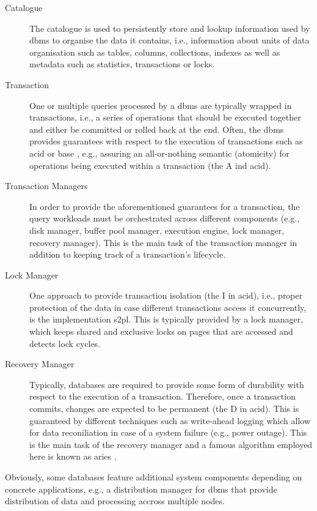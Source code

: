 \begin{description}
    \item[Catalogue] The catalogue is used to persistently store and lookup information used by \acrshort{dbms} to organise the data it contains, i.e., information about units of data organisation such as tables, columns, collections, indexes as well as metadata such as statistics, transactions or locks.
    \item[Transaction] One or multiple queries processed by a \acrshort{dbms} are typically wrapped in transactions, i.e., a series of operations that should be executed together and either be committed or rolled back at the end. Often, the \acrshort{dbms} provides guarantees with respect to the execution of transactions such as \acrshort{acid} \cite{Haerder:1983principles} or \acrshort{base} \cite{Pritchett:2008Base}, e.g., assuring an all-or-nothing semantic (atomicity) for operations being executed within a transaction (the A ind \acrshort{acid}).
    \item[Transaction Managers] In order to provide the aforementioned guarantees for a transaction, the query workloads must be orchestrated across different components (e.g., disk manager, buffer pool manager, execution engine, lock manager, recovery manager). This is the main task of the transaction manager in addition to keeping track of a transaction's lifecycle.
    \item[Lock Manager] One approach to provide transaction isolation (the I in \acrshort{acid}), i.e., proper protection of the data in case different transactions access it concurrently, is the implementation \acrfull{s2pl}. This is typically provided by a lock manager, which keeps shared and exclusive locks on pages that are accessed and detects lock cycles.
    \item[Recovery Manager] Typically, databases are required to provide some form of durability with respect to the execution of a transaction. Therefore, once a transaction commits, changes are expected to be permanent (the D in \acrshort{acid}). This is guaranteed by different techniques such as write-ahead logging which allow for data reconiliation in case of a system failure (e.g., power outage). This is the main task of the recovery manager and a famous algorithm employed here is known as \acrshort{aries} \cite{Mohan:1992Aries}.
\end{description}

Obviously, some databases feature additional system components depending on concrete applications, e.g., a distribution manager for \acrshort{dbms} that provide distribution of data and processing accross multiple nodes.